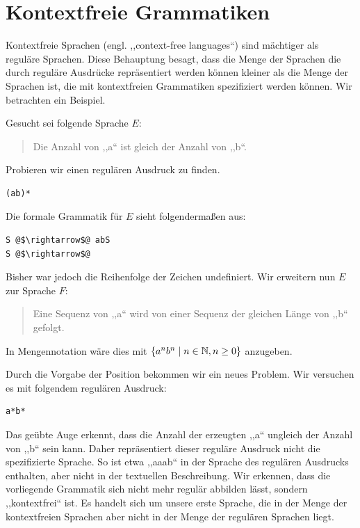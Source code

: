 \section{Kontextfreie Grammatiken}
%
Kontextfreie Sprachen (engl. ,,context-free languages``) sind mächtiger als reguläre Sprachen. Diese Behauptung besagt, dass die Menge der Sprachen die durch reguläre Ausdrücke repräsentiert werden können kleiner als die Menge der Sprachen ist, die mit kontextfreien Grammatiken spezifiziert werden können. Wir betrachten ein Beispiel.

Gesucht sei folgende Sprache $E$:
\begin{quote}
  Die Anzahl von ,,a`` ist gleich der Anzahl von ,,b``. 
\end{quote}

Probieren wir einen regulären Ausdruck zu finden.
\begin{lstlisting}
(ab)*
\end{lstlisting}

Die formale Grammatik für $E$ sieht folgendermaßen aus:
\begin{lstlisting}
S @$\rightarrow$@ abS
S @$\rightarrow$@
\end{lstlisting}

Bisher war jedoch die Reihenfolge der Zeichen undefiniert. Wir erweitern nun $E$ zur Sprache $F$:
\begin{quote}
  Eine Sequenz von ,,a`` wird von einer Sequenz der gleichen Länge von ,,b`` gefolgt.
\end{quote}
In Mengennotation wäre dies mit $\left\{a^n b^n \mid n \in \mathbb{N}, n \geq 0\right\}$ anzugeben.

Durch die Vorgabe der Position bekommen wir ein neues Problem. Wir versuchen es mit folgendem regulären Ausdruck:
\begin{lstlisting}
a*b*
\end{lstlisting}

Das geübte Auge erkennt, dass die Anzahl der erzeugten ,,a`` ungleich der Anzahl von ,,b`` sein kann. Daher repräsentiert dieser reguläre Ausdruck nicht die spezifizierte Sprache. So ist etwa ,,aaab`` in der Sprache des regulären Ausdrucks enthalten, aber nicht in der textuellen Beschreibung. Wir erkennen, dass die vorliegende Grammatik sich nicht mehr regulär abbilden lässt, sondern ,,kontextfrei`` ist. Es handelt sich um unsere erste Sprache, die in der Menge der kontextfreien Sprachen aber nicht in der Menge der regulären Sprachen liegt.

